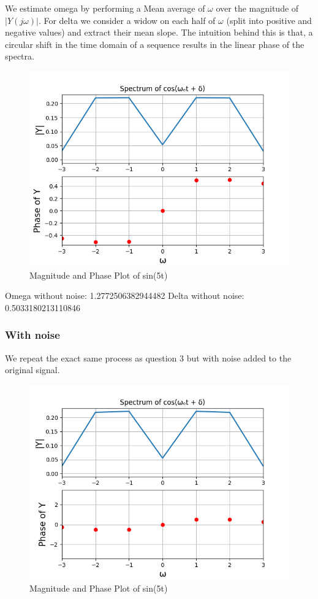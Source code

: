 \documentclass{article}
\begin{document}
We estimate omega by performing a Mean average of $\omega$ over the magnitude of $|Y(j\omega)|$.
For delta we consider a widow on each half of $\omega$ (split into positive and negative values) and extract their mean slope. The intuition behind this is that, a circular shift in the time domain of a sequence results in the linear phase of the spectra.

\begin{figure}[!ht]
  \centering
  \includegraphics[scale=0.6]{Figure_9.png}
  \caption{Magnitude and Phase Plot of sin(5t)}
  \label{fig:sample}
  \end{figure}


Omega without noise:  1.2772506382944482\newline
Delta without noise:   0.5033180213110846

\newpage
\subsubsection{With noise}
We repeat the exact same process as question 3 but with noise added to the original signal.
\begin{figure}[!ht]
  \centering
  \includegraphics[scale=0.6]{Figure_10.png}
  \caption{Magnitude and Phase Plot of sin(5t)}
  \label{fig:sample}
  \end{figure}
\end{document}
